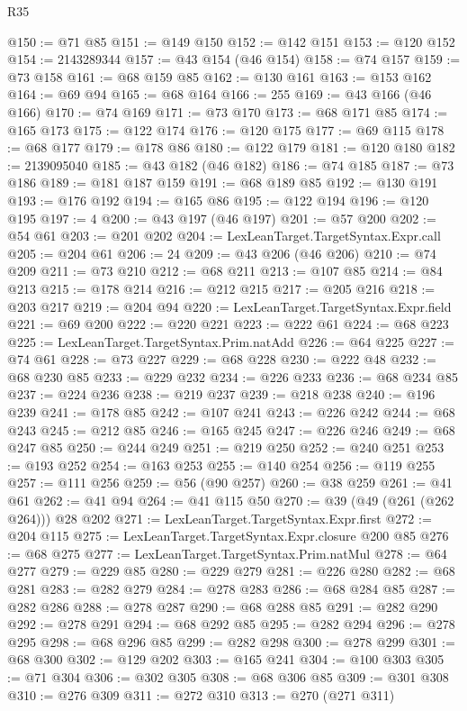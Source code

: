 \begin{lexlean}{R35}
\begin{coremodule}
@150 := @71 @85
@151 := @149 @150
@152 := @142 @151
@153 := @120 @152
@154 := 2143289344
@157 := @43 @154 (@46 @154)
@158 := @74 @157
@159 := @73 @158
@161 := @68 @159 @85
@162 := @130 @161
@163 := @153 @162
@164 := @69 @94
@165 := @68 @164
@166 := 255
@169 := @43 @166 (@46 @166)
@170 := @74 @169
@171 := @73 @170
@173 := @68 @171 @85
@174 := @165 @173
@175 := @122 @174
@176 := @120 @175
@177 := @69 @115
@178 := @68 @177
@179 := @178 @86
@180 := @122 @179
@181 := @120 @180
@182 := 2139095040
@185 := @43 @182 (@46 @182)
@186 := @74 @185
@187 := @73 @186
@189 := @181 @187 @159
@191 := @68 @189 @85
@192 := @130 @191
@193 := @176 @192
@194 := @165 @86
@195 := @122 @194
@196 := @120 @195
@197 := 4
@200 := @43 @197 (@46 @197)
@201 := @57 @200
@202 := @54 @61
@203 := @201 @202
@204 := LexLeanTarget.TargetSyntax.Expr.call
@205 := @204 @61
@206 := 24
@209 := @43 @206 (@46 @206)
@210 := @74 @209
@211 := @73 @210
@212 := @68 @211
@213 := @107 @85
@214 := @84 @213
@215 := @178 @214
@216 := @212 @215
@217 := @205 @216
@218 := @203 @217
@219 := @204 @94
@220 := LexLeanTarget.TargetSyntax.Expr.field
@221 := @69 @200
@222 := @220 @221
@223 := @222 @61
@224 := @68 @223
@225 := LexLeanTarget.TargetSyntax.Prim.natAdd
@226 := @64 @225
@227 := @74 @61
@228 := @73 @227
@229 := @68 @228
@230 := @222 @48
@232 := @68 @230 @85
@233 := @229 @232
@234 := @226 @233
@236 := @68 @234 @85
@237 := @224 @236
@238 := @219 @237
@239 := @218 @238
@240 := @196 @239
@241 := @178 @85
@242 := @107 @241
@243 := @226 @242
@244 := @68 @243
@245 := @212 @85
@246 := @165 @245
@247 := @226 @246
@249 := @68 @247 @85
@250 := @244 @249
@251 := @219 @250
@252 := @240 @251
@253 := @193 @252
@254 := @163 @253
@255 := @140 @254
@256 := @119 @255
@257 := @111 @256
@259 := @56 (@90 @257)
@260 := @38 @259
@261 := @41 @61
@262 := @41 @94
@264 := @41 @115 @50
@270 := @39 (@49 (@261 (@262 @264))) @28 @202
@271 := LexLeanTarget.TargetSyntax.Expr.first
@272 := @204 @115
@275 := LexLeanTarget.TargetSyntax.Expr.closure @200 @85
@276 := @68 @275
@277 := LexLeanTarget.TargetSyntax.Prim.natMul
@278 := @64 @277
@279 := @229 @85
@280 := @229 @279
@281 := @226 @280
@282 := @68 @281
@283 := @282 @279
@284 := @278 @283
@286 := @68 @284 @85
@287 := @282 @286
@288 := @278 @287
@290 := @68 @288 @85
@291 := @282 @290
@292 := @278 @291
@294 := @68 @292 @85
@295 := @282 @294
@296 := @278 @295
@298 := @68 @296 @85
@299 := @282 @298
@300 := @278 @299
@301 := @68 @300
@302 := @129 @202
@303 := @165 @241
@304 := @100 @303
@305 := @71 @304
@306 := @302 @305
@308 := @68 @306 @85
@309 := @301 @308
@310 := @276 @309
@311 := @272 @310
@313 := @270 (@271 @311)

\end{coremodule}
\end{lexlean}

